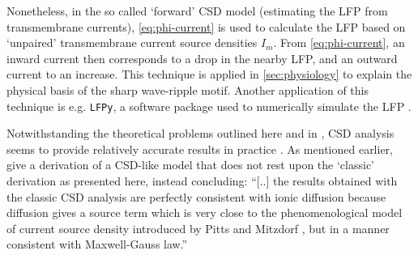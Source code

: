 Nonetheless, in the so called `forward' CSD model (estimating the LFP from transmembrane currents), \cref{eq:phi-current} is used to calculate the LFP based on `unpaired' transmembrane current source densities $I_m$. From \cref{eq:phi-current}, an inward current then corresponds to a drop in the nearby LFP, and an outward current to an increase. This technique is applied in \cref{sec:physiology} to explain the physical basis of the sharp wave-ripple motif. Another application of this technique is e.g. \texttt{LFPy}, a software package used to numerically simulate the LFP \cite{Linden2014}.

Notwithstanding the theoretical problems outlined here and in \cite{Bedard2011}, CSD analysis seems to provide relatively accurate results in practice \cite{Buzsaki2012a,Bedard2011}. As mentioned earlier, \citeauthor{Bedard2011} \cite{Bedard2011} give a derivation of a CSD-like model that does not rest upon the `classic' derivation as presented here, instead concluding: ``[..] the results obtained with the classic CSD analysis are perfectly consistent with ionic diffusion because diffusion gives a source term which is very close to the phenomenological model of current source density introduced by Pitts and Mitzdorf \cite{Mitzdorf1985,Pitts1952}, but in a manner consistent with Maxwell-Gauss law.''
